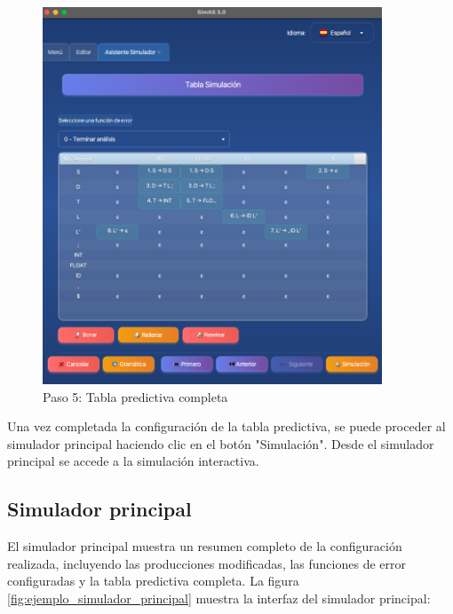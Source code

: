 \needspace{8cm}
\begin{figure}[H]
    \centering
    \includegraphics[width=0.9\textwidth]{figuras/ejemplo_practico/simulador_paso5.png}
    \caption{Paso 5: Tabla predictiva completa}
    \label{fig:ejemplo_simulador_paso5}
\end{figure}

Una vez completada la configuración de la tabla predictiva, se puede proceder al simulador principal haciendo clic en el botón \string"Simulación\string". Desde el simulador principal se accede a la simulación interactiva.

\subsection{Simulador principal}

El simulador principal muestra un resumen completo de la configuración realizada, incluyendo las producciones modificadas, las funciones de error configuradas y la tabla predictiva completa. La figura \ref{fig:ejemplo_simulador_principal} muestra la interfaz del simulador principal:

